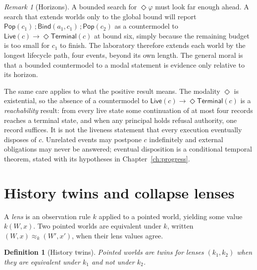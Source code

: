 \documentclass[11pt,openany]{book}
\newtheorem{definition}[theorem]{Definition}
\theoremstyle{remark}
\newtheorem{remark}[theorem]{Remark}
\newcommand{\Pop}{\mathsf{Pop}}
\newcommand{\Bind}{\mathsf{Bind}}
\begin{document}
\begin{remark}[Horizons]
A bounded search for $\Diamond\varphi$ must look far enough ahead. A
search that extends worlds only to the global bound will report
$\mathsf{Pop}(c_1)\,;\Bind(a_1,c_1)\,;\Pop(c_2)$ as a countermodel to
$\mathsf{Live}(c)\rightarrow\Diamond\mathsf{Terminal}(c)$ at bound six,
simply because the remaining budget is too small for $c_1$ to finish. The
laboratory therefore extends each world by the longest lifecycle path,
four events, beyond its own length. The general moral is that a bounded
countermodel to a modal statement is evidence only relative to its
horizon.

The same care applies to what the positive result means. The modality
$\Diamond$ is existential, so the absence of a countermodel to
$\mathsf{Live}(c)\rightarrow\Diamond\mathsf{Terminal}(c)$ is a
\emph{reachability} result: from every live state some continuation of at
most four records reaches a terminal state, and when any principal holds
refusal authority, one record suffices. It is not the liveness statement
that every execution eventually disposes of $c$. Unrelated events may
postpone $c$ indefinitely and external obligations may never be answered;
eventual disposition is a conditional temporal theorem, stated with its
hypotheses in Chapter~\ref{ch:progress}.
\end{remark}

\section{History twins and collapse lenses}

A \emph{lens} is an observation rule $k$ applied to a pointed world,
yielding some value $k(W,x)$. Two pointed worlds are equivalent under $k$,
written $(W,x)\approx_k(W',x')$, when their lens values agree.

\begin{definition}[History twins]
Pointed worlds are \emph{twins} for lenses $(k_1,k_2)$ when they are
equivalent under $k_1$ and not under $k_2$.
\end{definition}
\end{document}
